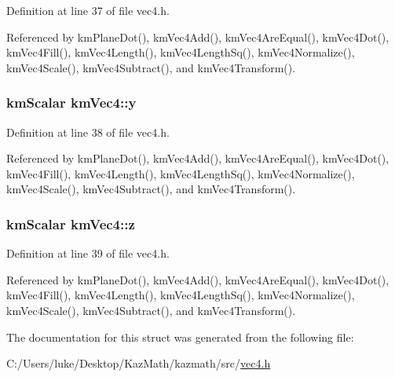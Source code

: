 Definition at line 37 of file vec4.h.

Referenced by kmPlaneDot(), kmVec4Add(), kmVec4AreEqual(), kmVec4Dot(), kmVec4Fill(), kmVec4Length(), kmVec4LengthSq(), kmVec4Normalize(), kmVec4Scale(), kmVec4Subtract(), and kmVec4Transform().\hypertarget{structkm_vec4_166ea934d56eca30a97b190d365b62b8}{
\subsubsection[{y}]{\setlength{\rightskip}{0pt plus 5cm}kmScalar {\bf kmVec4::y}}}
\label{structkm_vec4_166ea934d56eca30a97b190d365b62b8}




Definition at line 38 of file vec4.h.

Referenced by kmPlaneDot(), kmVec4Add(), kmVec4AreEqual(), kmVec4Dot(), kmVec4Fill(), kmVec4Length(), kmVec4LengthSq(), kmVec4Normalize(), kmVec4Scale(), kmVec4Subtract(), and kmVec4Transform().\hypertarget{structkm_vec4_f4e022632723b68a304ac40d308cceab}{
\subsubsection[{z}]{\setlength{\rightskip}{0pt plus 5cm}kmScalar {\bf kmVec4::z}}}
\label{structkm_vec4_f4e022632723b68a304ac40d308cceab}




Definition at line 39 of file vec4.h.

Referenced by kmPlaneDot(), kmVec4Add(), kmVec4AreEqual(), kmVec4Dot(), kmVec4Fill(), kmVec4Length(), kmVec4LengthSq(), kmVec4Normalize(), kmVec4Scale(), kmVec4Subtract(), and kmVec4Transform().

The documentation for this struct was generated from the following file:\begin{CompactItemize}
\item 
C:/Users/luke/Desktop/KazMath/kazmath/src/\hyperlink{vec4_8h}{vec4.h}\end{CompactItemize}

